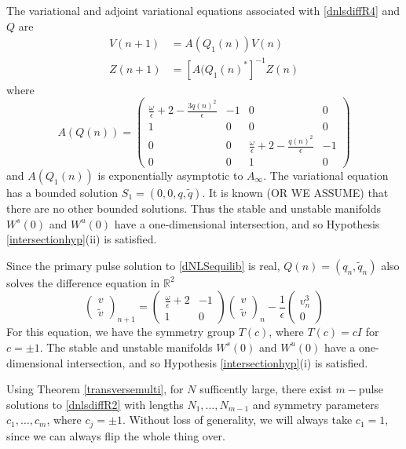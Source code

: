 \documentclass[12pt]{article}
\def\R{{\mathbb R}}
\begin{document}
The variational and adjoint variational equations associated with \eqref{dnlsdiffR4} and $Q$ are 
\begin{align}
V(n+1) &= A(Q_1(n)) V(n) \label{vareqdNLS} \\
Z(n+1) &= [A(Q_1(n)^*]^{-1} Z(n) \label{adjvareqdNLS}
\end{align}
where
\begin{equation}\label{AQdNLS}
A(Q(n)) = 
\begin{pmatrix}
\frac{\omega}{\epsilon} + 2 - \frac{3 q(n)^2}{\epsilon} & -1 & 0 & 0 \\
1 & 0 & 0 & 0 \\
0 & 0 & \frac{\omega}{\epsilon} + 2 - \frac{q(n)^2}{\epsilon} & -1 \\
0 & 0 & 1 & 0
\end{pmatrix}
\end{equation}
and $A(Q_1(n))$ is exponentially asymptotic to $A_\infty$. The variational equation has a bounded solution $S_1 = (0, 0, q, \tilde{q})$. It is known (OR WE ASSUME) that there are no other bounded solutions. Thus the stable and unstable manifolds $W^s(0)$ and $W^u(0)$ have a one-dimensional intersection, and so Hypothesis \ref{intersectionhyp}(ii) is satisfied.

Since the primary pulse solution to \eqref{dNLSequilib} is real, $Q(n) = (q_n, \tilde{q}_n)$ also solves the difference equation in $\R^2$
\begin{equation}\label{dnlsdiffR2}
\begin{pmatrix}
v \\ \tilde{v}
\end{pmatrix}_{n+1} =
\begin{pmatrix}
\frac{\omega}{\epsilon} + 2 & -1 \\
1 & 0 
\end{pmatrix}
\begin{pmatrix}
v \\ \tilde{v}
\end{pmatrix}_n
- \frac{1}{\epsilon} 
\begin{pmatrix} v_n^3 \\ 0 
\end{pmatrix}
\end{equation}
For this equation, we have the symmetry group $T(c)$, where $T(c) = c I$ for $c = \pm 1$. The stable and unstable manifolds $W^s(0)$ and $W^u(0)$ have a one-dimensional intersection, and so Hypothesis \ref{intersectionhyp}(i) is satisfied.

Using Theorem \ref{transversemulti}, for $N$ sufficently large, there exist $m-$pulse solutions to \eqref{dnlsdiffR2} with lengths $N_1, \dots, N_{m-1}$ and symmetry parameters $c_1, \dots, c_m$, where $c_j = \pm 1$. Without loss of generality, we will always take $c_1 = 1$, since we can always flip the whole thing over.
\end{document}
